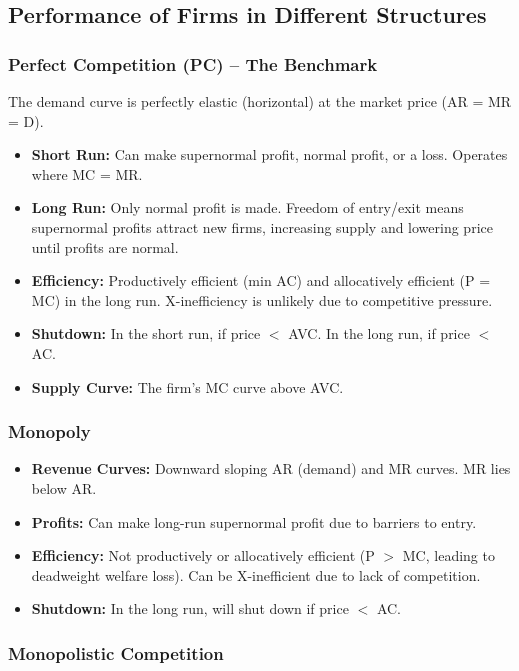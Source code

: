 \documentclass[11pt, a4paper, twoside]{book}
\begin{document}
\subsection{Performance of Firms in Different Structures}

\subsubsection{Perfect Competition (PC) -- The Benchmark}

The demand curve is perfectly elastic (horizontal) at the market price (AR = MR = D).

\begin{itemize}
  \item \textbf{Short Run:} Can make supernormal profit, normal profit, or a loss. Operates where MC = MR.
  \item \textbf{Long Run:} Only normal profit is made. Freedom of entry/exit means supernormal profits attract new firms, increasing supply and lowering price until profits are normal.
  \item \textbf{Efficiency:} Productively efficient (min AC) and allocatively efficient (P = MC) in the long run. X-inefficiency is unlikely due to competitive pressure.
  \item \textbf{Shutdown:} In the short run, if price $<$ AVC. In the long run, if price $<$ AC.
  \item \textbf{Supply Curve:} The firm's MC curve above AVC.
\end{itemize}

\subsubsection{Monopoly}

\begin{itemize}
  \item \textbf{Revenue Curves:} Downward sloping AR (demand) and MR curves. MR lies below AR.
  \item \textbf{Profits:} Can make long-run supernormal profit due to barriers to entry.
  \item \textbf{Efficiency:} Not productively or allocatively efficient (P $>$ MC, leading to deadweight welfare loss). Can be X-inefficient due to lack of competition.
  \item \textbf{Shutdown:} In the long run, will shut down if price $<$ AC.
\end{itemize}

\subsubsection{Monopolistic Competition}
\end{document}
